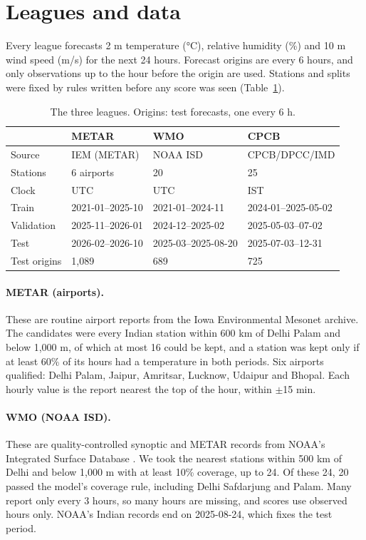 \section{Leagues and data}\label{sec:data}

Every league forecasts 2 m temperature (°C), relative humidity (\%) and 10 m wind speed (m/s) for the next 24
hours. Forecast origins are every 6 hours, and only observations up to the hour before the origin are used.
Stations and splits were fixed by rules written before any score was seen (Table~\ref{tab:leagues}).

\begin{table}[t]
\caption{The three leagues. Origins: test forecasts, one every 6 h.}
\label{tab:leagues}
\footnotesize
\setlength{\tabcolsep}{2.5pt}
\begin{tabular}{@{}llll@{}}
\toprule
 & METAR & WMO & CPCB \\
\midrule
Source & IEM (METAR) & NOAA ISD & CPCB/DPCC/IMD \\
Stations & 6 airports & 20 & 25 \\
Clock & UTC & UTC & IST \\
Train & 2021-01--2025-10 & 2021-01--2024-11 & 2024-01--2025-05-02 \\
Validation & 2025-11--2026-01 & 2024-12--2025-02 & 2025-05-03--07-02 \\
Test & 2026-02--2026-10 & 2025-03--2025-08-20 & 2025-07-03--12-31 \\
Test origins & 1,089 & 689 & 725 \\
\bottomrule
\end{tabular}
\end{table}

\paragraph{METAR (airports).}
These are routine airport reports from the Iowa Environmental Mesonet archive. The candidates were every Indian
station within 600 km of Delhi Palam and below 1,000 m, of which at most 16 could be kept, and a station was kept
only if at least 60\% of its hours had a temperature in both periods. Six airports qualified: Delhi Palam, Jaipur,
Amritsar, Lucknow, Udaipur and Bhopal. Each hourly value is the report nearest the top of the hour, within
$\pm$15 min.

\paragraph{WMO (NOAA ISD).}
These are quality-controlled synoptic and METAR records from NOAA's Integrated Surface Database \citep{smith2011isd}.
We took the nearest stations within 500 km of Delhi and below 1,000 m with at least 10\% coverage, up to 24.
Of these 24, 20 passed the model's coverage rule, including Delhi Safdarjung and Palam. Many report only every 3 hours, so many hours are missing,
and scores use observed hours only. NOAA's Indian records end on 2025-08-24, which fixes the test period.


